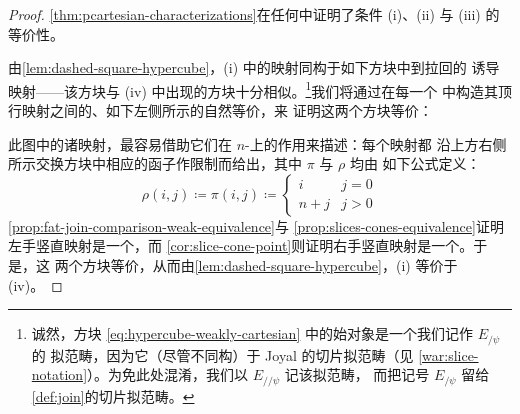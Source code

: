 \begin{proof}
\cref{thm:pcartesian-characterizations}在任何\trInfinityCosmos{}中证明了条件
(i)、(ii) 与 (iii) 的等价性。

由\cref{lem:dashed-square-hypercube}，(i) 中的映射同构于如下方块中到拉回的
诱导映射——该方块与 (iv) 中出现的方块十分相似。\footnote{诚然，方块
\eqref{eq:hypercube-weakly-cartesian} 中的始对象是一个我们记作 $E_{/\psi}$ 的
拟范畴，因为它\trEquivalence{}（尽管不同构）于 Joyal 的切片拟范畴（见
\cref{war:slice-notation}）。为免此处混淆，我们以 $E_{//\psi}$ 记该拟范畴，
而把记号 $E_{/\psi}$ 留给\cref{def:join}的切片拟范畴。}我们将通过在每一个%
\trWeaklyCartesianSquare{}中构造其顶行映射之间的、如下左侧所示的自然等价，来
证明这两个方块等价：
\begin{center}
\end{center}
此图中的诸映射，最容易借助它们在 $n$-\trSimplex{}上的作用来描述：每个映射都
沿上方右侧所示交换方块中相应的函子作限制而给出，其中 $\pi$ 与 $\rho$ 均由
如下公式定义：
\[
\rho(i,j)\coloneqq\pi(i,j)\coloneqq
\begin{cases}
i & j=0\\
n+j & j>0
\end{cases}
\]
\cref{prop:fat-join-comparison-weak-equivalence}与%
\cref{prop:slices-cones-equivalence}证明左手竖直映射是一个\trEquivalence，而
\cref{cor:slice-cone-point}则证明右手竖直映射是一个\trEquivalence。于是，这
两个方块等价，从而由\cref{lem:dashed-square-hypercube}，(i) 等价于 (iv)。


\end{proof}
